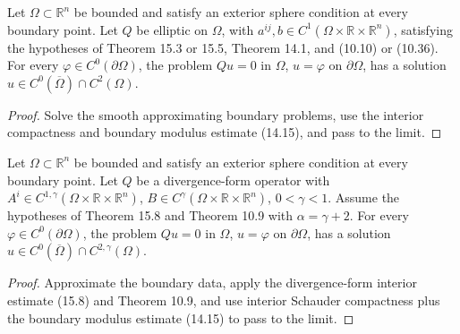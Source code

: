 \medskip

\begin{theorem}\label{gilbarg-trudinger.thm.15.18.continuous-data}
Let \(\Omega\subset\mathbb R^n\) be bounded and satisfy an exterior sphere
condition at every boundary point. Let \(Q\) be elliptic on \(\Omega\), with
\(a^{ij},b\in C^1(\Omega\times\mathbb R\times\mathbb R^n)\), satisfying the
hypotheses of Theorem 15.3 or 15.5, Theorem 14.1, and (10.10) or (10.36).
For every \(\varphi\in C^0(\partial\Omega)\), the problem
\(Qu=0\) in \(\Omega\), \(u=\varphi\) on \(\partial\Omega\), has a solution
\(u\in C^0(\overline\Omega)\cap C^2(\Omega)\).
\end{theorem}
\begin{proof}
\sketch Solve the smooth approximating boundary problems, use the interior
compactness and boundary modulus estimate (14.15), and pass to the limit.
\end{proof}

\medskip

\begin{theorem}\label{gilbarg-trudinger.thm.15.19.continuous-divergence-data}
Let \(\Omega\subset\mathbb R^n\) be bounded and satisfy an exterior sphere
condition at every boundary point. Let \(Q\) be a divergence-form operator
with \(A^i\in C^{1,\gamma}(\Omega\times\mathbb R\times\mathbb R^n)\),
\(B\in C^\gamma(\Omega\times\mathbb R\times\mathbb R^n)\), \(0<\gamma<1\).
Assume the hypotheses of Theorem 15.8 and Theorem 10.9 with
\(\alpha=\gamma+2\). For every \(\varphi\in C^0(\partial\Omega)\), the
problem \(Qu=0\) in \(\Omega\), \(u=\varphi\) on \(\partial\Omega\), has a
solution \(u\in C^0(\overline\Omega)\cap C^{2,\gamma}(\Omega)\).
\end{theorem}
\begin{proof}
\sketch Approximate the boundary data, apply the divergence-form interior
estimate (15.8) and Theorem 10.9, and use interior Schauder compactness plus
the boundary modulus estimate (14.15) to pass to the limit.
\end{proof}

\bigskip
